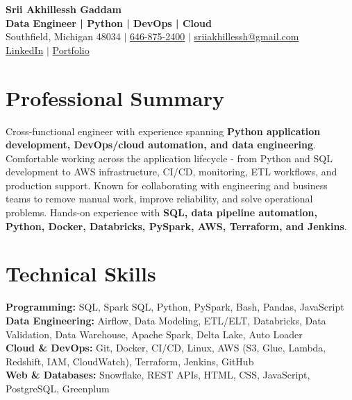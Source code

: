 \documentclass[letterpaper,10pt]{article}
\begin{document}
\fontsize{9.35pt}{10.45pt}\selectfont

\begin{center}
    {\LARGE \textbf{Srii Akhillessh Gaddam}} \\[-1pt]
    \textbf{Data Engineer | Python | DevOps | Cloud} \\[2pt]
    Southfield, Michigan 48034 $|$
    \href{tel:6468752400}{646-875-2400} $|$
    \href{mailto:sriiakhillessh@gmail.com}{sriiakhillessh@gmail.com} \\[1pt]
    \href{https://www.linkedin.com/in/srii-akhiilessh-gaddam-b48668191/}{LinkedIn} $|$
    \href{https://sriiakhillesshg.github.io/portfolio/}{Portfolio}
\end{center}
\vspace{-8pt}

\section{Professional Summary}
\small{Cross-functional engineer with experience spanning \textbf{Python application development, DevOps/cloud automation, and data engineering}. Comfortable working across the application lifecycle - from Python and SQL development to AWS infrastructure, CI/CD, monitoring, ETL workflows, and production support. Known for collaborating with engineering and business teams to remove manual work, improve reliability, and solve operational problems. Hands-on experience with \textbf{SQL, data pipeline automation, Python, Docker, Databricks, PySpark, AWS, Terraform, and Jenkins}.}

\section{Technical Skills}
\small{
\textbf{Programming:} SQL, Spark SQL, Python, PySpark, Bash, Pandas, JavaScript \\
\textbf{Data Engineering:} Airflow, Data Modeling, ETL/ELT, Databricks, Data Validation, Data Warehouse, Apache Spark, Delta Lake, Auto Loader \\
\textbf{Cloud \& DevOps:} Git, Docker, CI/CD, Linux, AWS (S3, Glue, Lambda, Redshift, IAM, CloudWatch), Terraform, Jenkins, GitHub \\
\textbf{Web \& Databases:} Snowflake, REST APIs, HTML, CSS, JavaScript, PostgreSQL, Greenplum
}
\end{document}
